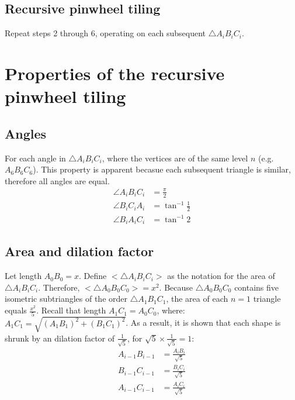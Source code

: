 

\subsection{Recursive pinwheel tiling}
Repeat steps 2 through 6, operating on each subsequent $\triangle A_{i}B_{i}C_{i}$.


\newpage



\section{Properties of the recursive pinwheel tiling}
\subsection{Angles}
For each angle in $\triangle A_{i}B_{i}C_{i}$, where the vertices are of the same level $n$ (e.g. \angle $A_{6}B_{6}C_{6}$). This property is apparent becasue each subsequent triangle is similar, therefore all angles are equal.
\begin{equation}
    \begin{aligned}
        \angle A_{i}B_{i}C_{i} &= \frac{\pi}{2} \\
        \angle B_{i}C_{i}A_{i} &= \tan^{-1}\frac{1}{2} \\
        \angle B_{i}A_{i}C_{i} &= \tan^{-1}2
    \end{aligned}
\end{equation}

\subsection{Area and dilation factor}
Let length $A_{0}B_{0} = x$. Define $\big<\triangle A_{i}B_{i}C_{i}\big>$ as the notation for the area of $\triangle A_{i}B_{i}C_{i}$. Therefore, $\big<\triangle A_{0}B_{0}C_{0}\big> = x^2$. Because $\triangle A_{0}B_{0}C_{0}$ contains five isometric subtriangles of the order $\triangle A_{1}B_{1}C_{1}$, the area of each $n = 1$ triangle equals $\frac{x^2}{5}$. Recall that length $A_{1}C_{1} = A_{0}C_{0}$, where: $A_{1}C_{1} = \sqrt{(A_{1}B_{1})^2 + (B_{1}C_{1})^2}$. As a result, it is shown that each shape is shrunk by an dilation factor of $\frac{1}{\sqrt{5}}$, for $\sqrt{5} \times \frac{1}{\sqrt{5}} = 1$:
\begin{equation}
    \begin{aligned}
        A_{i-1}B_{i-1} &= \frac{A_{i}B_{i}}{\sqrt{5}} \\
        B_{i-1}C_{i-1} &= \frac{B_{i}C_{i}}{\sqrt{5}} \\
        A_{i-1}C_{i-1} &= \frac{A_{i}C_{i}}{\sqrt{5}}
    \end{aligned}
\end{equation}

